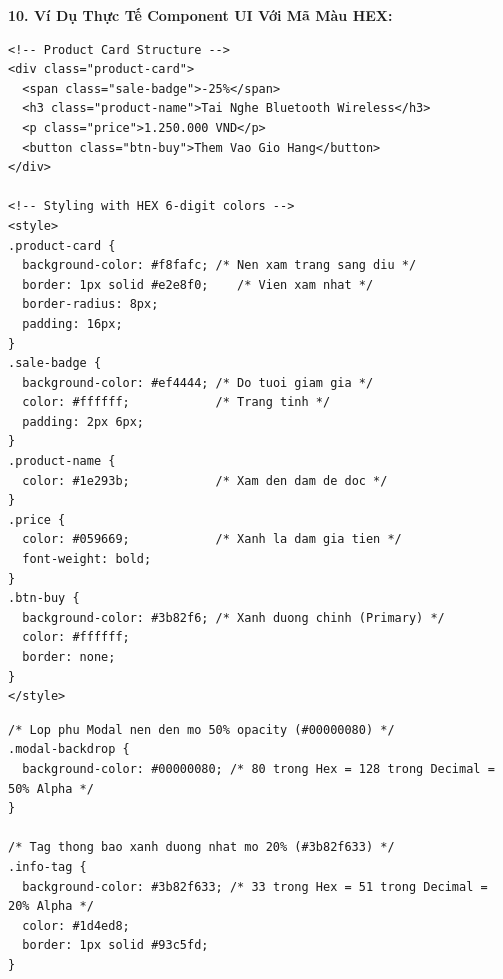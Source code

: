\documentclass[11pt,oneside]{book}
\begin{document}
\textbf{10. Ví Dụ Thực Tế Component UI Với Mã Màu HEX:}

\begin{codeWindow}
\begin{lstlisting}[language=HTML5]
<!-- Product Card Structure -->
<div class="product-card">
  <span class="sale-badge">-25%</span>
  <h3 class="product-name">Tai Nghe Bluetooth Wireless</h3>
  <p class="price">1.250.000 VND</p>
  <button class="btn-buy">Them Vao Gio Hang</button>
</div>

<!-- Styling with HEX 6-digit colors -->
<style>
.product-card {
  background-color: #f8fafc; /* Nen xam trang sang diu */
  border: 1px solid #e2e8f0;    /* Vien xam nhat */
  border-radius: 8px;
  padding: 16px;
}
.sale-badge {
  background-color: #ef4444; /* Do tuoi giam gia */
  color: #ffffff;            /* Trang tinh */
  padding: 2px 6px;
}
.product-name {
  color: #1e293b;            /* Xam den dam de doc */
}
.price {
  color: #059669;            /* Xanh la dam gia tien */
  font-weight: bold;
}
.btn-buy {
  background-color: #3b82f6; /* Xanh duong chinh (Primary) */
  color: #ffffff;
  border: none;
}
</style>
\end{lstlisting}
\end{codeWindow}

\begin{codeWindow}
\begin{lstlisting}[language=CSS3]
/* Lop phu Modal nen den mo 50% opacity (#00000080) */
.modal-backdrop {
  background-color: #00000080; /* 80 trong Hex = 128 trong Decimal = 50% Alpha */
}

/* Tag thong bao xanh duong nhat mo 20% (#3b82f633) */
.info-tag {
  background-color: #3b82f633; /* 33 trong Hex = 51 trong Decimal = 20% Alpha */
  color: #1d4ed8;
  border: 1px solid #93c5fd;
}
\end{lstlisting}
\end{codeWindow}
\end{document}
